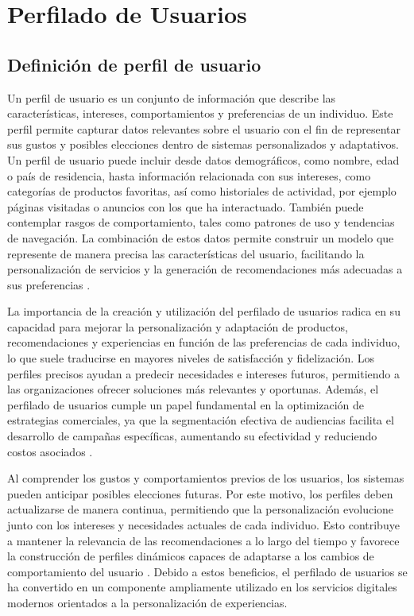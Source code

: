 \section{Perfilado de Usuarios}\label{sec:perfilado_usuarios}

\subsection{Definición de perfil de usuario}\label{subsec:definicion_perfil}

Un perfil de usuario es un conjunto de información que describe las características, intereses, comportamientos y preferencias de un individuo. Este perfil permite capturar datos relevantes sobre el usuario con el fin de representar sus gustos y posibles elecciones dentro de sistemas personalizados y adaptativos. Un perfil de usuario puede incluir desde datos demográficos, como nombre, edad o país de residencia, hasta información relacionada con sus intereses, como categorías de productos favoritas, así como historiales de actividad, por ejemplo páginas visitadas o anuncios con los que ha interactuado. También puede contemplar rasgos de comportamiento, tales como patrones de uso y tendencias de navegación. La combinación de estos datos permite construir un modelo que represente de manera precisa las características del usuario, facilitando la personalización de servicios y la generación de recomendaciones más adecuadas a sus preferencias \parencite{EkeEtAl2019}.

La importancia de la creación y utilización del perfilado de usuarios radica en su capacidad para mejorar la personalización y adaptación de productos, recomendaciones y experiencias en función de las preferencias de cada individuo, lo que suele traducirse en mayores niveles de satisfacción y fidelización. Los perfiles precisos ayudan a predecir necesidades e intereses futuros, permitiendo a las organizaciones ofrecer soluciones más relevantes y oportunas. Además, el perfilado de usuarios cumple un papel fundamental en la optimización de estrategias comerciales, ya que la segmentación efectiva de audiencias facilita el desarrollo de campañas específicas, aumentando su efectividad y reduciendo costos asociados \parencite{KanojeEtAl2014}.

Al comprender los gustos y comportamientos previos de los usuarios, los sistemas pueden anticipar posibles elecciones futuras. Por este motivo, los perfiles deben actualizarse de manera continua, permitiendo que la personalización evolucione junto con los intereses y necesidades actuales de cada individuo. Esto contribuye a mantener la relevancia de las recomendaciones a lo largo del tiempo y favorece la construcción de perfiles dinámicos capaces de adaptarse a los cambios de comportamiento del usuario \parencite{EkeEtAl2019}. Debido a estos beneficios, el perfilado de usuarios se ha convertido en un componente ampliamente utilizado en los servicios digitales modernos orientados a la personalización de experiencias.

